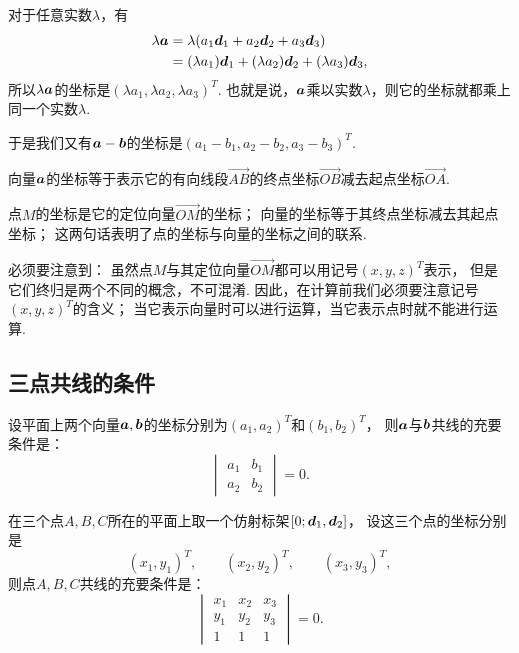对于任意实数\(\lambda\)，有\begin{align*}
\lambda \boldsymbol{a}
&= \lambda (a_1 \boldsymbol{d}_1 + a_2 \boldsymbol{d}_2 + a_3 \boldsymbol{d}_3) \\
&= (\lambda a_1) \boldsymbol{d}_1 + (\lambda a_2) \boldsymbol{d}_2 + (\lambda a_3) \boldsymbol{d}_3,
\end{align*}
所以\(\lambda \boldsymbol{a}\)的坐标是\((\lambda a_1,\lambda a_2,\lambda a_3)^T\).
也就是说，\(\boldsymbol{a}\)乘以实数\(\lambda\)，则它的坐标就都乘上同一个实数\(\lambda\).

于是我们又有\(\boldsymbol{a}-\boldsymbol{b}\)的坐标是\((a_1-b_1,a_2-b_2,a_3-b_3)^T\).

\begin{theorem}
向量\(\boldsymbol{a}\)的坐标等于表示它的有向线段\(\vec{AB}\)的终点坐标\(\vec{OB}\)减去起点坐标\(\vec{OA}\).
\end{theorem}

点\(M\)的坐标是它的定位向量\(\vec{OM}\)的坐标；
向量的坐标等于其终点坐标减去其起点坐标；
这两句话表明了点的坐标与向量的坐标之间的联系.

必须要注意到：
虽然点\(M\)与其定位向量\(\vec{OM}\)都可以用记号\((x,y,z)^T\)表示，
但是它们终归是两个不同的概念，不可混淆.
因此，在计算前我们必须要注意记号\((x,y,z)^T\)的含义；
当它表示向量时可以进行运算，当它表示点时就不能进行运算.

\subsection{三点共线的条件}
\begin{theorem}\label{theorem:解析几何.平面上两向量共线的充要条件}
设平面上两个向量\(\boldsymbol{a},\boldsymbol{b}\)的坐标分别为\((a_1,a_2)^T\)和\((b_1,b_2)^T\)，
则\(\boldsymbol{a}\)与\(\boldsymbol{b}\)共线的充要条件是：\[
\begin{vmatrix}
	a_1 & b_1 \\
	a_2 & b_2
\end{vmatrix} = 0.
\]
\end{theorem}

\begin{theorem}\label{theorem:解析几何.平面上三点共线的充要条件}
在三个点\(A,B,C\)所在的平面上取一个仿射标架\([0;\boldsymbol{d}_1,\boldsymbol{d}_2]\)，
设这三个点的坐标分别是\[
	(x_1,y_1)^T, \qquad
	(x_2,y_2)^T, \qquad
	(x_3,y_3)^T,
\]
则点\(A,B,C\)共线的充要条件是：\[
\begin{vmatrix}
	x_1 & x_2 & x_3 \\
	y_1 & y_2 & y_3 \\
	1 & 1 & 1
\end{vmatrix} = 0.
\]
\end{theorem}

